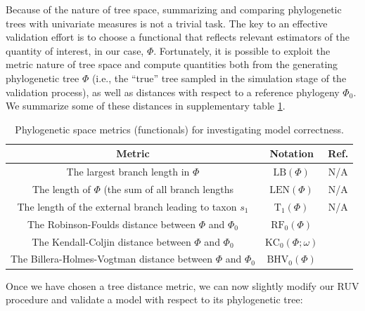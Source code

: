 \documentclass[oneside]{article}
\begin{document}
Because of the nature of tree space, summarizing and comparing phylogenetic
trees with univariate measures is not a trivial task.
The key to an effective validation effort is to choose a functional
that reflects relevant estimators of the quantity of interest, in our case,
$\Phi$.
Fortunately, it is possible to exploit the metric nature of tree space and compute
quantities both from the generating phylogenetic tree $\Phi$ (i.e., the ``true''
tree sampled in the simulation stage of the validation process), as well as distances 
with respect to a reference phylogeny $\Phi_0$.
We summarize some of these distances in supplementary table \ref{suptab:dists}.

\begin{table}[h]
  \caption{Phylogenetic space metrics (functionals) for investigating model correctness.}
  \label{suptab:dists}
  \centering
  \begin{tabular}{ c|c|c }
    \hline
    Metric & Notation & Ref. \\
    \hline  
    The largest branch length in $\Phi$ & $\text{LB}(\Phi)$ & N/A\\
    The length of $\Phi$ (the sum of all branch lengths & $\text{LEN}(\Phi)$ & N/A\\
    The length of the external branch leading to taxon $s_1$ & $\text{T}_1(\Phi)$ & N/A\\
    The Robinson-Foulds distance between $\Phi$ and $\Phi_0$ & $\text{RF}_0(\Phi)$ & \citep{Robinson1981}\\
    The Kendall-Coljin distance between $\Phi$ and $\Phi_0$ & $\text{KC}_0(\Phi;\omega)$ & \citep{Kendall2016}\\
    The Billera-Holmes-Vogtman distance between $\Phi$ and $\Phi_0$ & $\text{BHV}_0(\Phi)$ & \citep{Billera2001}\\
    \hline
  \end{tabular}
\end{table}

Once we have chosen a tree distance metric, we can now slightly modify
our RUV procedure and validate a model with respect to its
phylogenetic tree:
   
\end{document}
